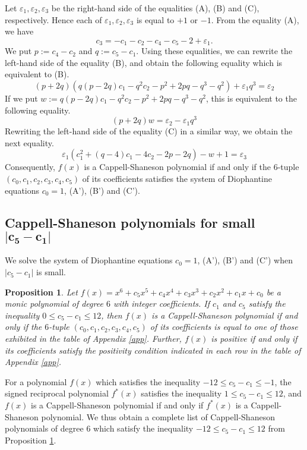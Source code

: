 \documentclass{amsart}
\theoremstyle{plain}
\newtheorem{prop}[thm]{Proposition}
\theoremstyle{definition}
\theoremstyle{remark}
\begin{document}
Let $\varepsilon_1,\varepsilon_2,\varepsilon_3$ be the right-hand side of the equalities (A), (B) and (C), 
respectively. Hence each of $\varepsilon_1,\varepsilon_2,\varepsilon_3$ is equal to $+1$ or $-1$. 
From the equality (A), we have 
\begin{equation}
c_3=-c_1-c_2-c_4-c_5-2+\varepsilon_1.  \tag{A'}
\end{equation}
We put $p:=c_4-c_2$ and $q:=c_5-c_1$. 
Using these equalities, we can rewrite the left-hand side of the equality (B), and obtain the following 
equality which is equivalent to (B). 
\[
(p+2q)(q(p-2q)c_1-q^2c_2-p^2+2pq-q^3-q^2)+\varepsilon_1q^3=\varepsilon_2
\]
If we put $w:=q(p-2q)c_1-q^2c_2-p^2+2pq-q^3-q^2$, this is equivalent to the following equality. 
\begin{equation}
(p+2q)w=\varepsilon_2-\varepsilon_1q^3 \tag{B'}
\end{equation}
Rewriting the left-hand side of the equality (C) in a similar way, we obtain the next equality. 
\begin{equation}
\varepsilon_1(c_1^2+(q-4)c_1-4c_2-2p-2q)-w+1=\varepsilon_3 \tag{C'}
\end{equation}
Consequently, $f(x)$ is a Cappell-Shaneson polynomial if and only if the $6$-tuple 
$(c_0,c_1,c_2,c_3,c_4,c_5)$ of its coefficients satisfies the system of Diophantine equations $c_0=1$, 
(A'), (B') and (C'). 

\subsection{Cappell-Shaneson polynomials for small $\boldsymbol{|c_5-c_1|}$}

We solve the system of Diophantine equations $c_0=1$, (A'), (B') and (C') 
when $|c_5-c_1|$ is small. 

\begin{prop}\label{CS6}
Let $f(x)=x^6+c_5x^5+c_4x^4+c_3x^3+c_2x^2+c_1x+c_0$ be 
a monic polynomial of degree $6$ with integer coefficients. 
If $c_1$ and $c_5$ satisfy the inequality $0\leq c_5-c_1\leq 12$, 
then $f(x)$ is a Cappell-Shaneson polynomial if and only if the $6$-tuple $(c_0,c_1,c_2,c_3,c_4,c_5)$ of 
its coefficients is equal to one of those exhibited in the table of Appendix \ref{app}. 
Further, $f(x)$ is positive if and only if its coefficients satisfy 
the positivity condition indicated in each row in the table of Appendix \ref{app}. 
\end{prop}

For a polynomial $f(x)$ which satisfies the inequality $-12\leq c_5-c_1\leq -1$, 
the signed reciprocal polynomial $f^*(x)$ satisfies the inequality $1\leq c_5-c_1\leq 12$, 
and $f(x)$ is a Cappell-Shaneson polynomial if and only if $f^*(x)$ is a Cappell-Shaneson polynomial. 
We thus obtain a complete list of Cappell-Shaneson polynomials of degree $6$ 
which satisfy the inequality $-12\leq c_5-c_1\leq 12$ from Proposition \ref{CS6}. 
\end{document}
